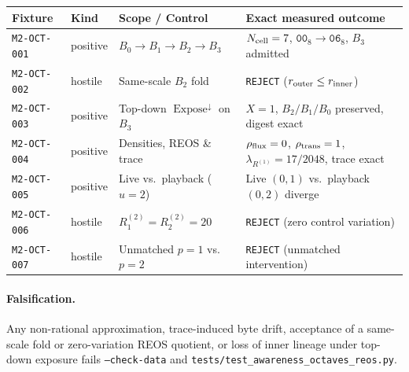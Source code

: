 \begin{center}
\begin{tabular}{llll}
\toprule Fixture & Kind & Scope / Control & Exact measured outcome\\\midrule
\texttt{M2-OCT-001} & positive & \(B_0\to B_1\to B_2\to B_3\) & \(N_{\rm cell}=7\), \(\mathtt{00}_8\to\mathtt{06}_8\), \(B_3\) admitted\\
\texttt{M2-OCT-002} & hostile & Same-scale \(B_2\) fold & \texttt{REJECT} (\(r_{\rm outer}\le r_{\rm inner}\))\\
\texttt{M2-OCT-003} & positive & Top-down \(\operatorname{Expose}^\downarrow\) on \(B_3\) & \(X=1\), \(B_2/B_1/B_0\) preserved, digest exact\\
\texttt{M2-OCT-004} & positive & Densities, REOS \& trace & \(\rho_{\rm flux}=0\), \(\rho_{\rm trans}=1\), \(\lambda_{R^{(1)}}=17/2048\), trace exact\\
\texttt{M2-OCT-005} & positive & Live vs.\ playback (\(u=2\)) & Live \((0,1)\) vs.\ playback \((0,2)\) diverge\\
\texttt{M2-OCT-006} & hostile & \(R^{(2)}_1=R^{(2)}_2=20\) & \texttt{REJECT} (zero control variation)\\
\texttt{M2-OCT-007} & hostile & Unmatched \(p=1\) vs.\ \(p=2\) & \texttt{REJECT} (unmatched intervention)\\
\bottomrule
\end{tabular}
\end{center}

\paragraph{Falsification.}
Any non-rational approximation, trace-induced byte drift, acceptance of a
same-scale fold or zero-variation REOS quotient, or loss of inner lineage under
top-down exposure fails \texttt{--check-data} and
\texttt{tests/test\_awareness\_octaves\_reos.py}.

